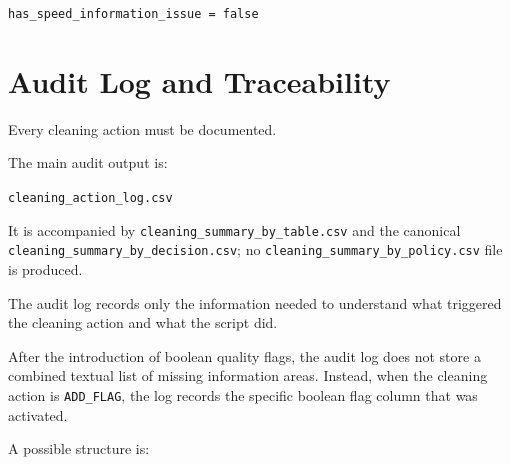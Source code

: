 \documentclass[a4paper,11pt]{article}
\begin{document}
	\begin{center}
		\texttt{has\_speed\_information\_issue = false}
	\end{center}
	
	
	\section{Audit Log and Traceability}
	
	Every cleaning action must be documented.
	
	The main audit output is:
	
	\begin{center}
		\texttt{cleaning\_action\_log.csv}
	\end{center}
	It is accompanied by \texttt{cleaning\_summary\_by\_table.csv} and the canonical
	\texttt{cleaning\_summary\_by\_decision.csv}; no
	\texttt{cleaning\_summary\_by\_policy.csv} file is produced.
	
	The audit log records only the information needed to understand what triggered the cleaning action and what the script did.
	
	After the introduction of boolean quality flags, the audit log does not store a combined textual list of missing information areas.
	Instead, when the cleaning action is \texttt{ADD\_FLAG}, the log records the specific boolean flag column that was activated.
	
	A possible structure is:
	
\end{document}
